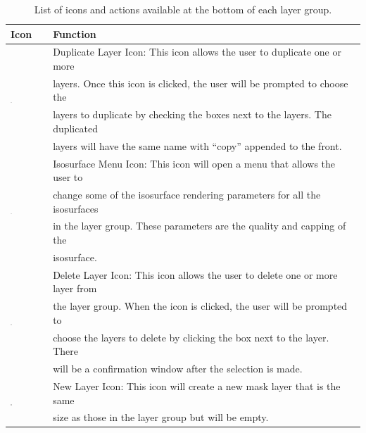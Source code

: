 \documentclass[fleqn,11pt,openany]{book}
\begin{document}
 \begin{table}[h!]
\label{tab:layerbottomicons}
\caption{List of icons and actions available at the bottom of each layer group.}
\begin{tabular}{|l|l|}
\hline
{\bf Icon} & {\bf Function}\\
\hline
\multirow{4}{*}{ \includegraphics[width=0.05\textwidth]{Seg3DBasicFunctionality_figures/DuplicateOff.png} }
& Duplicate Layer Icon:  This icon allows the user to duplicate one or more\\
& layers.  Once this icon is clicked, the user will be prompted to choose the\\
& layers to duplicate by checking the boxes next to the layers.  The duplicated\\
& layers will have the same name with ``copy'' appended to the front.\\ 
\hline
\multirow{4}{*}{ \includegraphics[width=0.05\textwidth]{Seg3DBasicFunctionality_figures/IsosurfaceMenuOff.png} }
& Isosurface Menu Icon: This icon will open a menu that allows the user to\\
& change  some of the isosurface rendering parameters for all the isosurfaces\\
& in the layer group.  These parameters are the quality and capping of the \\
& isosurface.\\
\hline
\multirow{4}{*}{ \includegraphics[width=0.05\textwidth]{Seg3DBasicFunctionality_figures/Minus.png} }
& Delete Layer Icon: This icon allows the user to delete one or more layer from \\
& the layer group.  When the icon is clicked, the user will be prompted to \\
& choose the layers to delete by clicking the box next to the layer.  There\\
& will be a confirmation window after the selection is made.\\
\hline
\multirow{2}{*}{ \includegraphics[width=0.05\textwidth]{Seg3DBasicFunctionality_figures/Add.png} }
& New Layer Icon:  This icon will create a new mask layer that is the same \\
& size as those in the layer group but will be empty.\\
\hline
\end{tabular}
\end{table}
\end{document}
